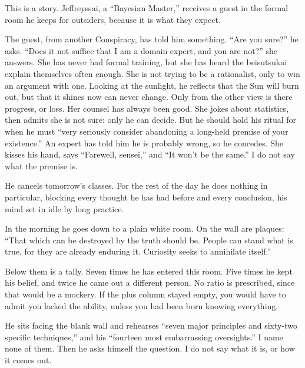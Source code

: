 
This is a story. Jeffreyssai, a ``Bayesian Master,'' receives a guest in the formal room he keeps for outsiders, because it is what they expect. 

The guest, from another Conspiracy, has told him something. ``Are you sure?'' he asks. ``Does it not suffice that I am a domain expert, and you are not?'' she answers. She has never had formal training, but she has heard the beisutsukai explain themselves often enough. She is not trying to be a rationalist, only to win an argument with one. Looking at the sunlight, he reflects that the Sun will burn out, but that it shines now can never change. Only from the other view is there progress, or loss. Her counsel has always been good. She jokes about statistics, then admits she is not sure: only he can decide. But he should hold his ritual for when he must ``very seriously consider abandoning a long-held premise of your existence.'' An expert has told him he is probably wrong, so he concedes. She kisses his hand, says ``Farewell, sensei,'' and ``It won't be the same.'' I do not say what the premise is.

He cancels tomorrow's classes. For the rest of the day he does nothing in particular, blocking every thought he has had before and every conclusion, his mind set in idle by long practice. 

In the morning he goes down to a plain white room. On the wall are plaques: ``That which can be destroyed by the truth should be. People can stand what is true, for they are already enduring it. Curiosity seeks to annihilate itself.'' 

Below them is a tally. Seven times he has entered this room. Five times he kept his belief, and twice he came out a different person. No ratio is prescribed, since that would be a mockery. If the plus column stayed empty, you would have to admit you lacked the ability, unless you had been born knowing everything. 

He sits facing the blank wall and rehearses ``seven major principles and sixty-two specific techniques,'' and his ``fourteen most embarrassing oversights.'' I name none of them. Then he asks himself the question. I do not say what it is, or how it comes out. 
